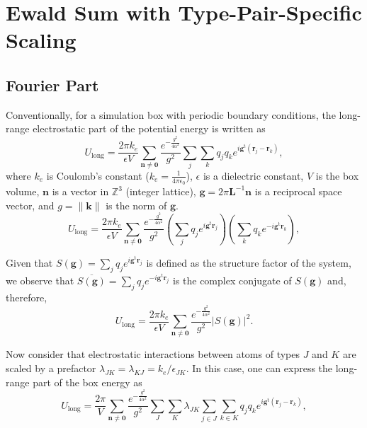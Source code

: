 \documentclass[11pt]{article}
\newcommand{\vt}[1]{\boldsymbol{\mathbf{#1}}}           %
\newcommand{\tr}[1]{#1^\text{t}}                        %
\begin{document}
\section{Ewald Sum with Type-Pair-Specific Scaling}

\subsection{Fourier Part}

Conventionally, for a simulation box with periodic boundary conditions, the long-range electrostatic part of the potential energy is written as
\begin{equation*}
U_\text{long} = \frac{2\pi k_e}{\epsilon V}\sum_{\vt n \neq \vt 0} \frac{e^{-\frac{g^2}{4\alpha^2}}}{g^2} \sum_j \sum_k q_j q_k e^{i \tr{\vt g}({\vt r}_j - {\vt r}_k)},
\end{equation*}
where $k_e$ is Coulomb's constant ($k_e = \frac{1}{4\pi\epsilon_0}$), $\epsilon$ is a dielectric constant, $V$ is the box volume, $\vt n$ is a vector in $\mathbb Z^3$ (integer lattice), $\vt g = 2\pi \vt L^{-1}{\vt n}$ is a reciprocal space vector, and $g = \|\vt k\|$ is the norm of $\vt g$. 
\begin{equation*}
U_\text{long} = \frac{2\pi k_e}{\epsilon V}\sum_{\vt n \neq \vt 0} \frac{e^{-\frac{g^2}{4\alpha^2}}}{g^2} \left(\sum_j q_j e^{i \tr{\vt g}{\vt r}_j} \right) \left(\sum_k q_k e^{-i \tr{\vt g}{\vt r}_k}\right),
\end{equation*}

Given that $S(\vt g) = \sum_j q_j e^{i \tr{\vt g}{\vt r}_j}$ is defined as the structure factor of the system, we observe that $\overline{S(\vt g)} = \sum_j q_j e^{-i \tr{\vt g}{\vt r}_j}$ is the complex conjugate of $S(\vt g)$ and, therefore,
\begin{equation*}
U_\text{long} = \frac{2\pi k_e}{\epsilon V}\sum_{\vt n \neq \vt 0} \frac{e^{-\frac{g^2}{4\alpha^2}}}{g^2} |S(\vt g)|^2.
\end{equation*}

Now consider that electrostatic interactions between atoms of types $J$ and $K$ are scaled by a prefactor $\lambda_{JK} = \lambda_{KJ} = k_e/\epsilon_{JK}$. In this case, one can express the long-range part of the box energy as
\begin{equation*}
U_\text{long} = \frac{2\pi}{V}\sum_{\vt n \neq \vt 0} \frac{e^{-\frac{g^2}{4\alpha^2}}}{g^2} \sum_J \sum_K \lambda_{JK} \sum_{j \in J} \sum_{k \in K} q_j q_k e^{i \tr{\vt g}({\vt r}_j - {\vt r}_k)},
\end{equation*}
\end{document}
